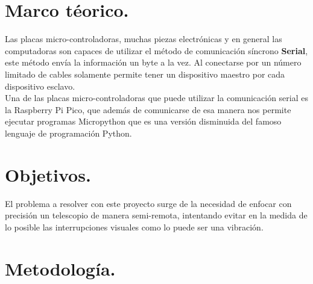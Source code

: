 \documentclass{article}
\begin{document}
    \section{Marco téorico.}
        Las placas micro-controladoras, muchas piezas electrónicas y en general las computadoras son capaces de utilizar el método de comunicación síncrono \textbf{Serial}, este método envía la información un byte a la vez. Al conectarse por un número limitado de cables solamente permite tener un dispositivo maestro por cada dispositivo esclavo.\\
        Una de las placas micro-controladoras que puede utilizar la comunicación serial es la Raspberry Pi Pico, que además de comunicarse de esa manera nos permite ejecutar programas Micropython que es una versión disminuida del famoso lenguaje de programación Python.\\

    \section{Objetivos.}
        El problema a resolver con este proyecto surge de la necesidad de enfocar con precisión un telescopio de manera semi-remota, intentando evitar en la medida de lo posible las interrupciones visuales como lo puede ser una vibración.\\

    \section{Metodología.}
\end{document}
